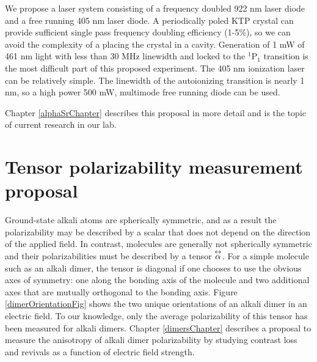We propose a laser system consisting of a frequency doubled 922 nm laser diode and a free running 405 nm laser diode. A periodically poled KTP crystal can provide sufficient single pass frequency doubling efficiency (1-5\%), so we can avoid the complexity of a placing the crystal in a cavity. Generation of 1 mW of 461 nm light with less than 30 MHz linewidth and locked to the $^1\textrm{P}_1$ transition is the most difficult part of this proposed experiment. The 405 nm ionization laser can be relatively simple. The linewidth of the autoionizing transition is nearly 1 nm, so a high power 500 mW, multimode free running diode can be used.

Chapter \ref{alphaSrChapter} describes this proposal in more detail and is the topic of current research in our lab.






\pagebreak
\section{Tensor polarizability measurement proposal}

Ground-state alkali atoms are spherically symmetric, and as a result the polarizability may be described by a scalar that does not depend on the direction of the applied field. In contrast, molecules are generally not spherically symmetric and their polarizabilities must be described by a tensor $\overset{\leftrightarrow}{\alpha}$. For a simple molecule such as an alkali dimer, the tensor is diagonal if one chooses to use the obvious axes of symmetry: one along the bonding axis of the molecule and two additional axes that are mutually orthogonal to the bonding axis. Figure \ref{dimerOrientationFig} shows the two unique orientations of an alkali dimer in an electric field. To our knowledge, only the average polarizability of this tensor has been measured \cite{Tar93,Mol74} for alkali dimers. Chapter \ref{dimersChapter} describes a proposal to measure the anisotropy of alkali dimer polarizability by studying contrast loss and revivals as a function of electric field strength. 


